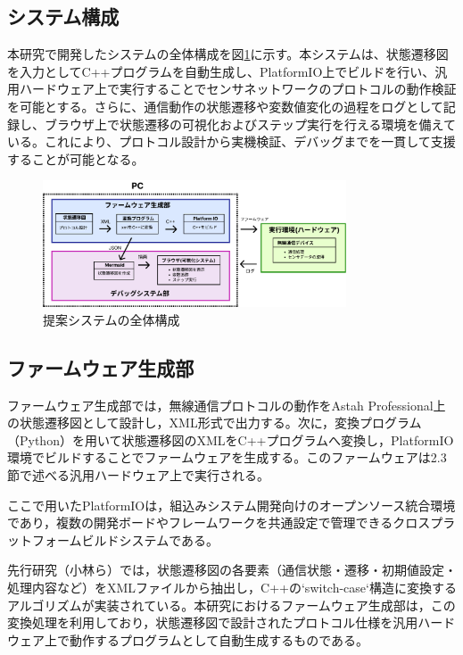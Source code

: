 \documentclass[technicalreport]{ieicej}
\begin{document}
\subsection{システム構成}
本研究で開発したシステムの全体構成を図\ref{fig:system-composition}に示す。本システムは、状態遷移図を入力としてC++プログラムを自動生成し、PlatformIO上でビルドを行い、汎用ハードウェア上で実行することでセンサネットワークのプロトコルの動作検証を可能とする。さらに、通信動作の状態遷移や変数値変化の過程をログとして記録し、ブラウザ上で状態遷移の可視化およびステップ実行を行える環境を備えている。これにより、プロトコル設計から実機検証、デバッグまでを一貫して支援することが可能となる。
\begin{figure}[h]
  \centering
  \includegraphics[width=90mm]{./images/system-composition.pdf}
  \caption{提案システムの全体構成}
  \label{fig:system-composition}
\end{figure}


\subsection{ファームウェア生成部}
ファームウェア生成部では，無線通信プロトコルの動作をAstah Professional上の状態遷移図として設計し，XML形式で出力する。次に，変換プログラム（Python）を用いて状態遷移図のXMLをC++プログラムへ変換し，PlatformIO環境でビルドすることでファームウェアを生成する。このファームウェアは2.3節で述べる汎用ハードウェア上で実行される。

ここで用いたPlatformIOは，組込みシステム開発向けのオープンソース統合環境であり，複数の開発ボードやフレームワークを共通設定で管理できるクロスプラットフォームビルドシステムである\cite{PlatformIO}。

先行研究（小林ら\cite{kobayashi2023}）では，状態遷移図の各要素（通信状態・遷移・初期値設定・処理内容など）をXMLファイルから抽出し，C++の`switch-case`構造に変換するアルゴリズムが実装されている。本研究におけるファームウェア生成部は，この変換処理を利用しており，状態遷移図で設計されたプロトコル仕様を汎用ハードウェア上で動作するプログラムとして自動生成するものである。
\end{document}

